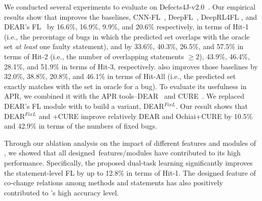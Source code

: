 We conducted several experiments to evaluate {\tool} on
Defects4J-v2.0~\cite{defects4j}. Our empirical results show that
{\tool} improves the baselines, CNN-FL~\cite{zhang2019cnn},
DeepFL~\cite{DeepFL}, DeepRL4FL \cite{icse21-fl}, and DEAR's
FL~\cite{icse22} by 16.6\%, 16.9\%, 9.9\%, and 20.6\% respectively, in
terms of Hit-1 (i.e., the percentage of bugs in which the predicted
set overlaps with the oracle set {\em at least} one faulty statement),
and by 33.6\%, 40.3\%, 26.5\%, and 57.5\% in terms of Hit-2
(i.e., the number of overlapping statements $\geq$2), 43.9\%, 46.4\%,
28.1\%, and 51.9\% in terms of Hit-3, respectively.
{\tool} also improves those baselines by 32.0\%, 38.8\%, 20.8\%, and
46.1\% in terms of Hit-All (i.e., the predicted set exactly matches
with the set in oracle for a bug).
%
%
To evaluate its usefulness in APR, we combined it with the APR
tools--DEAR~\cite{icse22} and CURE~\cite{cure-icse21}. We replaced
DEAR's FL module with {\tool} to build a variant, DEAR$^{FixL}$. Our
result shows that DEAR$^{FixL}$ and {\tool}+CURE improve relatively
DEAR and Ochiai+CURE by 10.5\% and 42.9\% in terms of the numbers of fixed
bugs.



Through our ablation analysis on the impact of different features and
modules of {\tool}, we showed that all designed~features/modules have
contributed to its high performance. Specifically, the proposed
dual-task learning significantly improves the statement-level FL by up
to 12.8\% in terms of Hit-1. The designed feature of co-change
relations among methods and statements has also positively contributed
to {\tool}'s high accuracy level.


